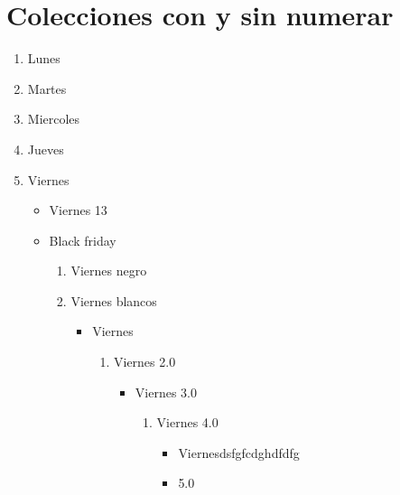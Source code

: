 \documentclass[10pt,a4paper]{article}
\begin{document}
	\section{Colecciones con y sin numerar}
		\begin{enumerate}
			\item Lunes
			\item Martes
			\item Miercoles
			\item Jueves
			\item Viernes
				\begin{itemize}
					\item Viernes 13
					\item Black friday
						\begin{enumerate}
							\item Viernes negro
							\item Viernes blancos
								\begin{itemize}
										\item Viernes
											\begin{enumerate}
												\item Viernes 2.0
													\begin{itemize}
														\item Viernes 3.0
															\begin{enumerate}
																\item Viernes 4.0																	\begin{itemize}
																	\item Viernesdsfgfcdghdfdfg
																	\item 5.0
																\end{itemize}
															\end{enumerate}
													\end{itemize}
											\end{enumerate}
								\end{itemize}
						\end{enumerate}
				\end{itemize}
		\end{enumerate}
		
\end{document}
